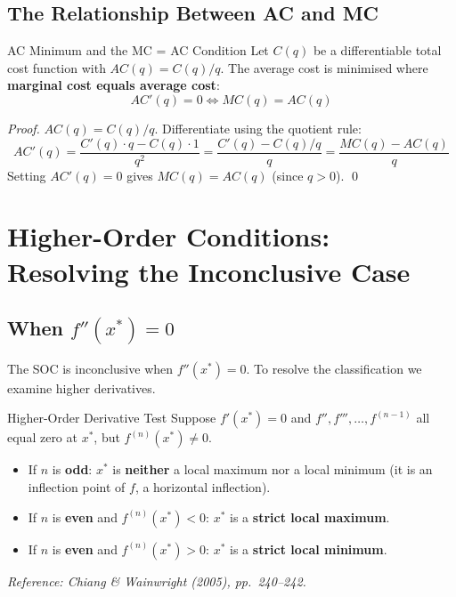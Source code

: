 \documentclass[12pt, a4paper]{article}
\theoremstyle{definition}
\begin{document}
\subsection{The Relationship Between AC and MC}

\begin{propbox}{AC Minimum and the MC = AC Condition}
Let $C(q)$ be a differentiable total cost function with $AC(q)=C(q)/q$.
The average cost is minimised where \textbf{marginal cost equals average
cost}:
\[
  AC'(q) = 0 \iff MC(q) = AC(q)
\]
\end{propbox}

\begin{proof}
$AC(q) = C(q)/q$.  Differentiate using the quotient rule:
\[
  AC'(q) = \frac{C'(q)\cdot q - C(q)\cdot 1}{q^2}
          = \frac{C'(q) - C(q)/q}{q}
          = \frac{MC(q) - AC(q)}{q}
\]
Setting $AC'(q)=0$ gives $MC(q) = AC(q)$ (since $q>0$). \qed
\end{proof}

\section{Higher-Order Conditions: Resolving the Inconclusive Case}

\subsection{When $f''(x^*) = 0$}

The SOC is inconclusive when $f''(x^*)=0$.  To resolve the classification
we examine higher derivatives.

\begin{thmbox}{Higher-Order Derivative Test}
Suppose $f'(x^*) = 0$ and $f'', f''', \ldots, f^{(n-1)}$ all equal zero
at $x^*$, but $f^{(n)}(x^*) \neq 0$.
\begin{itemize}
  \item If $n$ is \textbf{odd}: $x^*$ is \textbf{neither} a local maximum
        nor a local minimum (it is an inflection point of $f$, a horizontal
        inflection).
  \item If $n$ is \textbf{even} and $f^{(n)}(x^*) < 0$: $x^*$ is a
        \textbf{strict local maximum}.
  \item If $n$ is \textbf{even} and $f^{(n)}(x^*) > 0$: $x^*$ is a
        \textbf{strict local minimum}.
\end{itemize}
\emph{Reference: Chiang \& Wainwright (2005), pp.\ 240--242.}
\end{thmbox}
\end{document}
